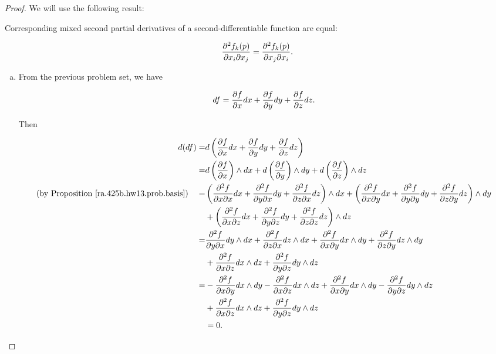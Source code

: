 \begin{proof}

We will use the following result:

\begin{corollary}

Corresponding mixed second partial derivatives of a second-differentiable function are equal:

\[
\pderiv{^2 f_k(p)}{x_i \partial x_j} = \pderiv{^2 f_k(p)}{x_j \partial x_i} .
\]

\end{corollary}

\begin{enumerate}[(a)]

\item From the previous problem set, we have 

\[
df = \pderiv{f}{x} dx + \pderiv{f}{y} dy + \pderiv{f}{z} dz.
\]

Then 

\begin{align*}
d(df) = & d \left(  \pderiv{f}{x} dx + \pderiv{f}{y} dy + \pderiv{f}{z} dz \right) 
\\ = &  d \left(  \pderiv{f}{x}  \right) \wedge dx + d \left( \pderiv{f}{y}  \right) \wedge dy + d \left(  \pderiv{f}{z}  \right) \wedge dz 
\\ \text{(by Proposition \ref{ra.425b.hw13.prob.basis})} \quad = &   \left(  \pderiv{^2 f}{x \partial x} dx + \pderiv{^2 f}{y \partial x}dy  + \pderiv{^2 f}{z \partial x}  dz \right) \wedge dx +  \left(  \pderiv{^2 f}{x \partial y} dx+ \pderiv{^2 f}{y \partial y}  dy+ \pderiv{^2 f}{z \partial y} dz  \right) \wedge dy 
\\ & +  \left(   \pderiv{^2 f}{x \partial z}dx + \pderiv{^2 f}{y \partial z}dy + \pderiv{^2 f}{z \partial z}dz   \right) \wedge dz 
\\ = &   \pderiv{^2 f}{y \partial x}dy  \wedge dx  + \pderiv{^2 f}{z \partial x}  dz \wedge dx +  \pderiv{^2 f}{x \partial y} dx\wedge dy  + \pderiv{^2 f}{z \partial y} dz   \wedge dy 
\\ & +    \pderiv{^2 f}{x \partial z}dx \wedge dz+ \pderiv{^2 f}{y \partial z}dy \wedge dz   
\\ = &   -\pderiv{^2 f}{x \partial y}dx  \wedge dy  - \pderiv{^2 f}{x \partial z}  dx \wedge dz +  \pderiv{^2 f}{x \partial y} dx\wedge dy  - \pderiv{^2 f}{y \partial z} dy   \wedge dz
\\ & +    \pderiv{^2 f}{x \partial z}dx \wedge dz+ \pderiv{^2 f}{y \partial z}dy \wedge dz   
\\ & = 0.
\end{align*}


\end{enumerate}
\end{proof}
